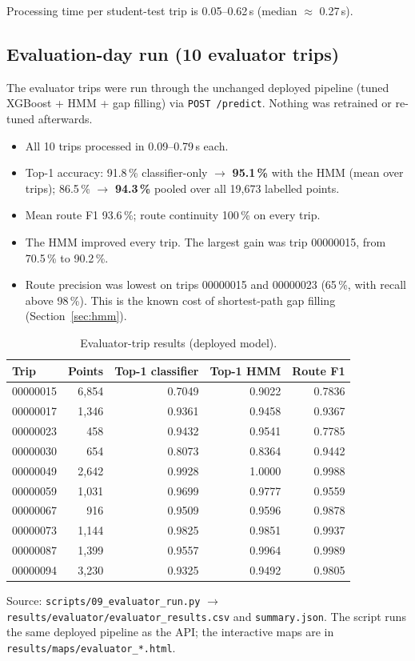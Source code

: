 \documentclass[10pt,a4paper]{article}
\newcommand{\code}[1]{\texttt{\small #1}}
\newcommand{\note}[1]{{\noindent\small\color{black!65}#1\par}}
\begin{document}
Processing time per student-test trip is 0.05--0.62\,s (median $\approx$ 0.27\,s).

\subsection{Evaluation-day run (10 evaluator trips)}\label{sec:evalday}
The evaluator trips were run through the unchanged deployed pipeline (tuned XGBoost + HMM + gap filling) via \code{POST /predict}. Nothing was retrained or re-tuned afterwards.
\begin{itemize}
  \item All 10 trips processed in 0.09--0.79\,s each.
  \item Top-1 accuracy: 91.8\,\% classifier-only $\rightarrow$ \textbf{95.1\,\%} with the HMM (mean over trips); 86.5\,\% $\rightarrow$ \textbf{94.3\,\%} pooled over all 19{,}673 labelled points.
  \item Mean route F1 93.6\,\%; route continuity 100\,\% on every trip.
  \item The HMM improved every trip. The largest gain was trip 00000015, from 70.5\,\% to 90.2\,\%.
  \item Route precision was lowest on trips 00000015 and 00000023 (65\,\%, with recall above 98\,\%). This is the known cost of shortest-path gap filling (Section~\ref{sec:hmm}).
\end{itemize}
\begin{table}[H]\centering\small
\caption{Evaluator-trip results (deployed model).}
\begin{tabular}{lrrrr}
\toprule
Trip & Points & Top-1 classifier & Top-1 HMM & Route F1\\
\midrule
00000015 & 6{,}854 & 0.7049 & 0.9022 & 0.7836\\
00000017 & 1{,}346 & 0.9361 & 0.9458 & 0.9367\\
00000023 & 458 & 0.9432 & 0.9541 & 0.7785\\
00000030 & 654 & 0.8073 & 0.8364 & 0.9442\\
00000049 & 2{,}642 & 0.9928 & 1.0000 & 0.9988\\
00000059 & 1{,}031 & 0.9699 & 0.9777 & 0.9559\\
00000067 & 916 & 0.9509 & 0.9596 & 0.9878\\
00000073 & 1{,}144 & 0.9825 & 0.9851 & 0.9937\\
00000087 & 1{,}399 & 0.9557 & 0.9964 & 0.9989\\
00000094 & 3{,}230 & 0.9325 & 0.9492 & 0.9805\\
\bottomrule
\end{tabular}
\end{table}
\note{Source: \code{scripts/09\_evaluator\_run.py} $\rightarrow$ \code{results/evaluator/evaluator\_results.csv} and \code{summary.json}. The script runs the same deployed pipeline as the API; the interactive maps are in \code{results/maps/evaluator\_*.html}.}
\end{document}
